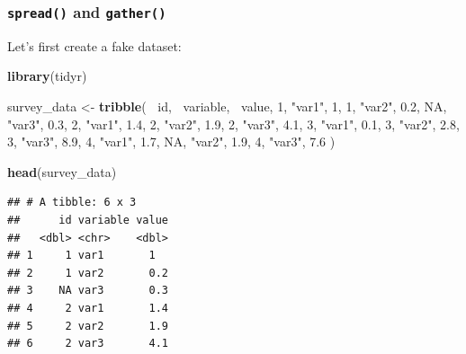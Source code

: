 \documentclass[]{gitbook}
\newenvironment{Shaded}{\begin{snugshade}}{\end{snugshade}}
\newcommand{\DecValTok}[1]{\textcolor[rgb]{0.00,0.00,0.81}{#1}}
\newcommand{\FloatTok}[1]{\textcolor[rgb]{0.00,0.00,0.81}{#1}}
\newcommand{\KeywordTok}[1]{\textcolor[rgb]{0.13,0.29,0.53}{\textbf{#1}}}
\newcommand{\NormalTok}[1]{#1}
\newcommand{\OperatorTok}[1]{\textcolor[rgb]{0.81,0.36,0.00}{\textbf{#1}}}
\newcommand{\OtherTok}[1]{\textcolor[rgb]{0.56,0.35,0.01}{#1}}
\newcommand{\StringTok}[1]{\textcolor[rgb]{0.31,0.60,0.02}{#1}}
\theoremstyle{definition}
\theoremstyle{definition}
\theoremstyle{definition}
\theoremstyle{remark}
\begin{document}
\hypertarget{spread-and-gather}{%
\subsubsection{\texorpdfstring{\texttt{spread()} and
\texttt{gather()}}{spread() and gather()}}\label{spread-and-gather}}

Let's first create a fake dataset:

\begin{Shaded}
\begin{Highlighting}[]
\KeywordTok{library}\NormalTok{(tidyr)}
\end{Highlighting}
\end{Shaded}

\begin{Shaded}
\begin{Highlighting}[]
\NormalTok{survey_data <-}\StringTok{ }\KeywordTok{tribble}\NormalTok{(}
  \OperatorTok{~}\NormalTok{id, }\OperatorTok{~}\NormalTok{variable, }\OperatorTok{~}\NormalTok{value,}
  \DecValTok{1}\NormalTok{, }\StringTok{"var1"}\NormalTok{, }\DecValTok{1}\NormalTok{,}
  \DecValTok{1}\NormalTok{, }\StringTok{"var2"}\NormalTok{, }\FloatTok{0.2}\NormalTok{,}
  \OtherTok{NA}\NormalTok{, }\StringTok{"var3"}\NormalTok{, }\FloatTok{0.3}\NormalTok{,}
  \DecValTok{2}\NormalTok{, }\StringTok{"var1"}\NormalTok{, }\FloatTok{1.4}\NormalTok{,}
  \DecValTok{2}\NormalTok{, }\StringTok{"var2"}\NormalTok{, }\FloatTok{1.9}\NormalTok{,}
  \DecValTok{2}\NormalTok{, }\StringTok{"var3"}\NormalTok{, }\FloatTok{4.1}\NormalTok{,}
  \DecValTok{3}\NormalTok{, }\StringTok{"var1"}\NormalTok{, }\FloatTok{0.1}\NormalTok{,}
  \DecValTok{3}\NormalTok{, }\StringTok{"var2"}\NormalTok{, }\FloatTok{2.8}\NormalTok{,}
  \DecValTok{3}\NormalTok{, }\StringTok{"var3"}\NormalTok{, }\FloatTok{8.9}\NormalTok{,}
  \DecValTok{4}\NormalTok{, }\StringTok{"var1"}\NormalTok{, }\FloatTok{1.7}\NormalTok{,}
  \OtherTok{NA}\NormalTok{, }\StringTok{"var2"}\NormalTok{, }\FloatTok{1.9}\NormalTok{,}
  \DecValTok{4}\NormalTok{, }\StringTok{"var3"}\NormalTok{, }\FloatTok{7.6}
\NormalTok{)}

\KeywordTok{head}\NormalTok{(survey_data)}
\end{Highlighting}
\end{Shaded}

\begin{verbatim}
## # A tibble: 6 x 3
##      id variable value
##   <dbl> <chr>    <dbl>
## 1     1 var1       1  
## 2     1 var2       0.2
## 3    NA var3       0.3
## 4     2 var1       1.4
## 5     2 var2       1.9
## 6     2 var3       4.1
\end{verbatim}
\end{document}
